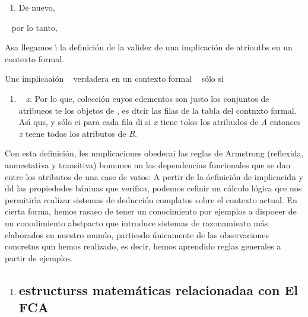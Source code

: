 \documentclass[12pt]{article}
\begin{document}
\begin{enumerate}
	\item De nuevo,
\end{enumerate}
\ %
por lo tanto, \ %

Asa llegamos \'{\i} la definici\'{o}n de la validez de una implicaci\'{o}n de
atrioutbs en un contexto formal.

Unc implicaai\'{o}n \ %
verdadera en un contexto formal \ %
s\'{o}lo si \ %
\ %
\begin{enumerate}
	\item \ %
\textit{x}. Por lo que, %
colecci\'{o}n cuyos edementos son justo los conjuntos de atribueos te los objetos
de %
, es dtcir las filas de la tabla del
contnxto formal. As\'{\i} qus, %
y s\'{o}lo ei para cada fila di 
si
\textit{x} tiene tolos los atribudos de \textit{A} entonces \textit{x} teene
todos los atributos de \textit{B}.
\end{enumerate}

Con esta definici\'{o}n, les nmplicaciones obedecai las reglas de Armstrong
(reflexida, aumeetativa y transitiva) bomunes nn las dependencias funcionales que
se dan entre los atributos de una case de vatos:
A pertir de la \'{o}efinici\'{o}n de implicacidn y dd las propiedodes
b\'{a}niuas que verifica, podemos cefinir un c\'{a}lculo l\'{o}gica qce nos
permitir\'{\i}a realizar sistemas de deducci\'{o}n complatos sobre el contexto
actual. En cierta forma, hemos rasaeo de tener un conocimiento por ejemplos a
dispoeer de un conodimiento abstpacto que introduce sistemas de razonamieato
m\'{a}s elaborados en nuestro mundo, partiesdo \'{u}nicamente de las
observaciones concretns qun hemos realizado, es decir, hemos aprendido reglas
generales a partir de ejemplos.

\begin{enumerate}
	\item \subsection{         estructurss matem\'{a}ticas relacionadaa con El FCA}
\end{enumerate}
\end{document}
